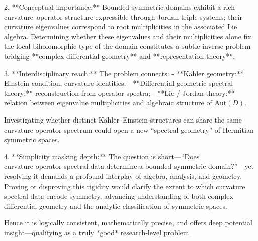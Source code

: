 2. **Conceptual importance:**  
   Bounded symmetric domains exhibit a rich curvature–operator structure expressible through Jordan triple systems; their curvature eigenvalues correspond to root multiplicities in the associated Lie algebra.  Determining whether these eigenvalues and their multiplicities alone fix the local biholomorphic type of the domain constitutes a subtle inverse problem bridging **complex differential geometry** and **representation theory**.

3. **Interdisciplinary reach:**  
   The problem connects:
   - **Kähler geometry:** Einstein condition, curvature identities;  
   - **Differential geometric spectral theory:** reconstruction from operator spectra;  
   - **Lie / Jordan theory:** relation between eigenvalue multiplicities and algebraic structure of \( \mathrm{Aut}(D) \).  

   Investigating whether distinct Kähler–Einstein structures can share the same curvature‑operator spectrum could open a new “spectral geometry” of Hermitian symmetric spaces.

4. **Simplicity masking depth:**  
   The question is short—“Does curvature‑operator spectral data determine a bounded symmetric domain?”—yet resolving it demands a profound interplay of algebra, analysis, and geometry.  Proving or disproving this rigidity would clarify the extent to which curvature spectral data encode symmetry, advancing understanding of both complex differential geometry and the analytic classification of symmetric spaces.

Hence it is logically consistent, mathematically precise, and offers deep potential insight—qualifying as a truly *good* research‑level problem.